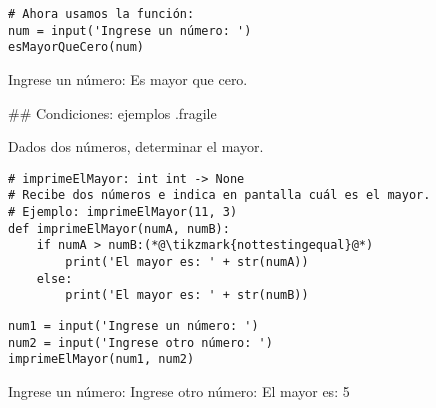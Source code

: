 \begin{lstlisting}
# Ahora usamos la función: 
num = input('Ingrese un número: ')
esMayorQueCero(num)
\end{lstlisting}

\vspace{-1ex}


\begin{exampleConsole}
Ingrese un número: 
Es mayor que cero.
\end{exampleConsole}

\trmcolumns

## Condiciones: ejemplos {.fragile}

\bgnblockgood
Dados dos números, determinar el mayor.
\trmblockgood

\vspace{-1ex}
\begin{lstlisting}[style=frame02]
# imprimeElMayor: int int -> None
# Recibe dos números e indica en pantalla cuál es el mayor.
# Ejemplo: imprimeElMayor(11, 3)
def imprimeElMayor(numA, numB):
    if numA > numB:(*@\tikzmark{nottestingequal}@*)
        print('El mayor es: ' + str(numA))
    else:
        print('El mayor es: ' + str(numB))
\end{lstlisting}

\vspace{-2ex}

\bgncolumns
{}


\begin{lstlisting}
num1 = input('Ingrese un número: ')
num2 = input('Ingrese otro número: ')
imprimeElMayor(num1, num2)
\end{lstlisting}



\begin{exampleConsole}
Ingrese un número: 
Ingrese otro número: 
El mayor es: 5
\end{exampleConsole}

\trmcolumns

\pause

\vspace{-3ex}

